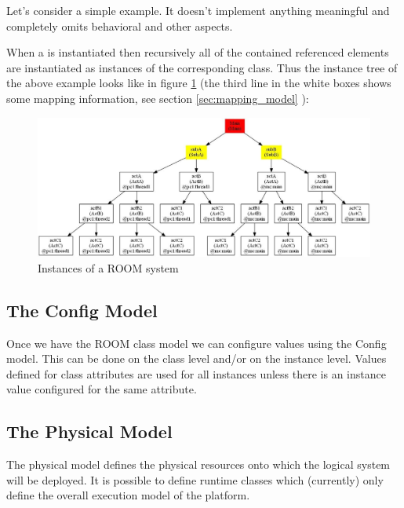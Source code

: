 Let's consider a simple example. It doesn't implement anything meaningful and completely omits behavioral and 
other aspects.



When a  is instantiated then recursively all of the contained referenced elements are 
instantiated as instances of the corresponding class. Thus the instance tree of the above example looks like 
in figure \ref{fig:instance_tree} (the third line in the white boxes shows some mapping information,
see section \ref{sec:mapping_model} ):

\begin{figure}
\includegraphics[scale=0.45]{images/080-instances.jpg}
\caption{Instances of a ROOM system}
\label{fig:instance_tree}
\end{figure}

\subsection{The Config Model}

Once we have the ROOM class model we can configure values using the Config model. This can be done on the 
class level and/or on the instance level. Values defined for class attributes are used for all instances 
unless there is an instance value configured for the same attribute.



\subsection{The Physical Model}

The physical model defines the physical resources onto which the logical system will be deployed. It is 
possible to define runtime classes which (currently) only define the overall execution model of the 
platform.

